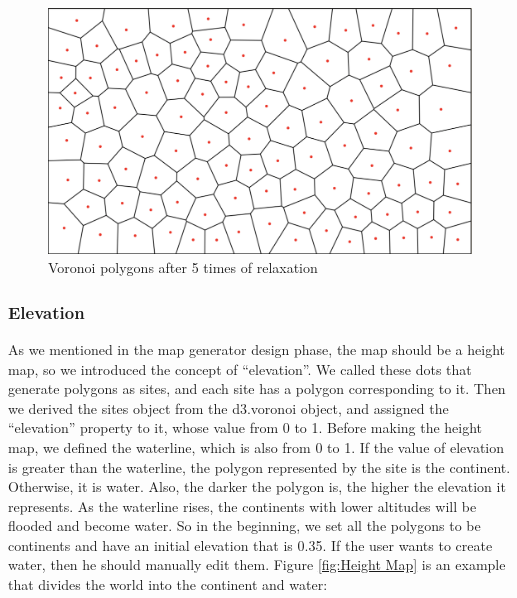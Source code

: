 \begin{figure}[htbp]
\centering
\includegraphics[width=\textwidth]{section04/assets/Map-voronoi-relaxation.png}
\caption[Voronoi polygons after 5 times of relaxation]{\label{fig:Voronoi relaxed polygons}Voronoi polygons after 5 times of relaxation}
\end{figure}

\subsubsection{Elevation}
As we mentioned in the map generator design phase, the map should be a height map, so we introduced the concept of ``elevation''. We called these dots that generate polygons as sites, and each site has a polygon corresponding to it. Then we derived the sites object from the d3.voronoi object, and assigned the ``elevation'' property to it, whose value from 0 to 1. Before making the height map, we defined the waterline, which is also from 0 to 1. If the value of elevation is greater than the waterline, the polygon represented by the site is the continent. Otherwise, it is water. Also, the darker the polygon is, the higher the elevation it represents. As the waterline rises, the continents with lower altitudes will be flooded and become water. So in the beginning, we set all the polygons to be continents and have an initial elevation that is 0.35. If the user wants to create water, then he should manually edit them. Figure \ref{fig:Height Map} is an example that divides the world into the continent and water:

